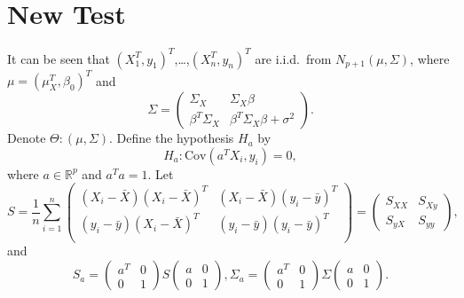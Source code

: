 \documentclass[review]{elsarticle}
\theoremstyle{plain}
\theoremstyle{definition}
\theoremstyle{remark}
\begin{document}
\section{New Test}
It can be seen that ${(X_1^T,y_1)}^T$,\ldots,${(X_n^T, y_n)}^T$ are i.i.d.\ from $N_{p+1}(\mu,\Sigma)$,
where
$\mu={(\mu_X^T,\beta_0)}^T$ and
\begin{equation*}
    \Sigma=\begin{pmatrix}
        \Sigma_X &  \Sigma_X \beta \\
        \beta^T \Sigma_X & \beta^T \Sigma_X\beta+\sigma^2
    \end{pmatrix}.
\end{equation*}
Denote $\Theta: (\mu,\Sigma)$.
Define the hypothesis $H_a$ by
\begin{equation}\label{Ha}
    H_a: \textrm{Cov}(a^T X_i, y_i)=0,
\end{equation}
where $a\in \mathbb{R}^p$ and $a^T a=1$.
Let
\begin{equation*}
    S=\frac{1}{n}\sum_{i=1}^n \begin{pmatrix}
        (X_i-\bar{X}){(X_i-\bar{X})}^T&(X_i-\bar{X}){(y_i-\bar{y})}^T\\
        (y_i-\bar{y}){(X_i-\bar{X})}^T&(y_i-\bar{y}){(y_i-\bar{y})}^T\\
        \end{pmatrix}=\begin{pmatrix}S_{XX} & S_{Xy} \\ S_{yX}& S_{yy}\end{pmatrix},
\end{equation*}
and
\begin{equation*}
    S_a=\begin{pmatrix}
        a^T& 0\\
        0& 1
    \end{pmatrix}
    S\begin{pmatrix}
        a& 0\\
        0& 1
    \end{pmatrix},
    \Sigma_a=\begin{pmatrix}
        a^T& 0\\
        0& 1
    \end{pmatrix}
    \Sigma\begin{pmatrix}
        a& 0\\
        0& 1
    \end{pmatrix}.
\end{equation*}
\end{document}
